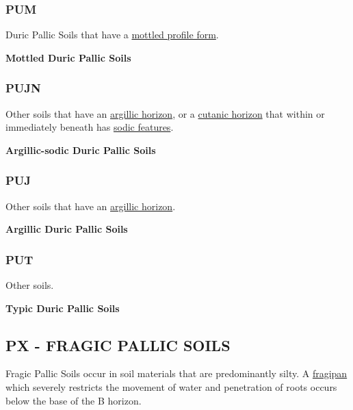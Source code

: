 \documentclass[
  letterpaper,
  DIV=11,
  numbers=noendperiod]{scrreprt}
\begin{document}
\hypertarget{sec-key-PUM}{%
\subsubsection{\texorpdfstring{\textbf{PUM}}{PUM}}\label{sec-key-PUM}}

Duric Pallic Soils that have a
\protect\hyperlink{sec-diag-mottpf}{mottled profile form}.

\textbf{Mottled Duric Pallic Soils}

\hypertarget{sec-key-PUJN}{%
\subsubsection{\texorpdfstring{\textbf{PUJN}}{PUJN}}\label{sec-key-PUJN}}

Other soils that have an \protect\hyperlink{sec-diag-argh}{argillic
horizon}, or a \protect\hyperlink{sec-diag-cuth}{cutanic horizon} that
within or immediately beneath has \protect\hyperlink{sec-diag-sod}{sodic
features}.

\textbf{Argillic-sodic Duric Pallic Soils}

\hypertarget{sec-key-PUJ}{%
\subsubsection{\texorpdfstring{\textbf{PUJ}}{PUJ}}\label{sec-key-PUJ}}

Other soils that have an \protect\hyperlink{sec-diag-argh}{argillic
horizon}.

\textbf{Argillic Duric Pallic Soils}

\hypertarget{sec-key-PUT}{%
\subsubsection{\texorpdfstring{\textbf{PUT}}{PUT}}\label{sec-key-PUT}}

Other soils.

\textbf{Typic Duric Pallic Soils}

\hypertarget{sec-PX}{%
\subsection{\texorpdfstring{\textbf{PX} - FRAGIC PALLIC
SOILS}{PX - FRAGIC PALLIC SOILS}}\label{sec-PX}}

Fragic Pallic Soils occur in soil materials that are predominantly
silty. A \protect\hyperlink{sec-diag-fpan}{fragipan} which severely
restricts the movement of water and penetration of roots occurs below
the base of the B horizon.
\end{document}
